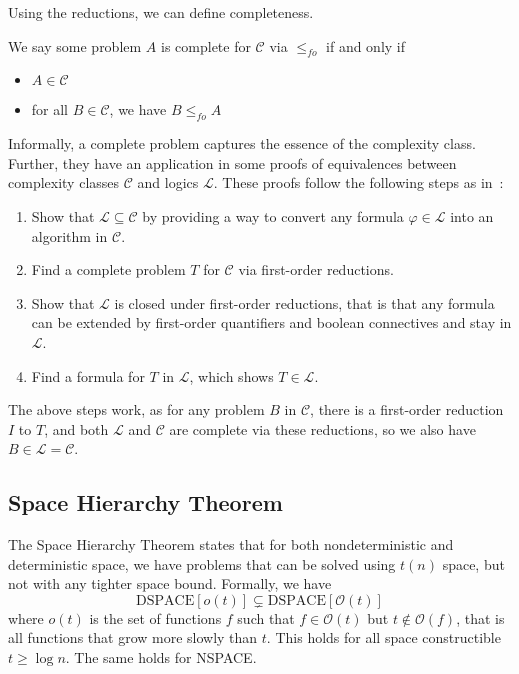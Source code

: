 Using the reductions, we can define completeness.

\begin{define}
    We say some problem $A$ is complete for $\mathcal{C}$ via $\leq_{fo}$ if and only if
    \begin{itemize}
        \setlength\itemsep{0.2em}
        \item $A \in \mathcal{C}$
        \item for all $B \in \mathcal{C}$, we have $B \leq_{fo} A$
    \end{itemize}
\end{define}

Informally, a complete problem captures the essence of the complexity class.
Further, they have an application in some proofs of equivalences between complexity classes $\mathcal{C}$ and logics $\mathcal{L}$.
These proofs follow the following steps as in~\cite{descriptive-complexity}:
\begin{enumerate}
    \item Show that $\mathcal{L} \subseteq \mathcal{C}$ by providing a way to convert any formula $\varphi \in \mathcal{L}$ into an algorithm in $\mathcal{C}$.
    \item Find a complete problem $T$ for $\mathcal{C}$ via first-order reductions.
    \item Show that $\mathcal{L}$ is closed under first-order reductions, that is that any formula can be extended by first-order quantifiers and boolean connectives and stay in $\mathcal{L}$.
    \item Find a formula for $T$ in $\mathcal{L}$, which shows $T \in \mathcal{L}$.
\end{enumerate}
The above steps work, as for any problem $B$ in $\mathcal{C}$, there is a first-order reduction $I$ to $T$, and both $\mathcal{L}$ and $\mathcal{C}$ are complete via these reductions, so we also have $B \in \mathcal{L} = \mathcal{C}$.

\subsection{Space Hierarchy Theorem}\label{subsec:space-hierarchy-theorem}

The Space Hierarchy Theorem states that for both nondeterministic and deterministic space, we have problems that can be solved using $t(n)$ space, but not with any tighter space bound.
Formally, we have
\[
    \text{DSPACE}[o(t)] \subsetneq \text{DSPACE}[\mathcal{O}(t)]
\]
where $o(t)$ is the set of functions $f$ such that $f \in \mathcal{O}(t)$ but $t \not \in \mathcal{O}(f)$, that is all functions that grow more slowly than $t$.
This holds for all space constructible $t \geq \log n$.
The same holds for NSPACE\@.

